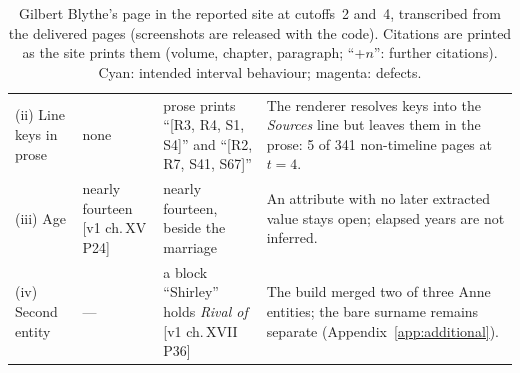 \begin{table}[t]
\begin{tabular}{@{}>{\raggedright\arraybackslash}p{2.35cm}>{\raggedright\arraybackslash}p{3.85cm}>{\raggedright\arraybackslash}p{4.45cm}>{\raggedright\arraybackslash}p{4.45cm}@{}}
(ii) Line keys in prose & none & prose prints ``[R3, R4, S1, S4]'' and ``[R2, R7, S41, S67]'' & The renderer resolves keys into the \emph{Sources} line but leaves them in the prose: 5 of 341 non-timeline pages at $t{=}4$. \\
(iii) Age & nearly fourteen [v1 ch.\,XV P24] & nearly fourteen, beside the marriage & An attribute with no later extracted value stays open; elapsed years are not inferred. \\
(iv) Second entity & --- & a block ``Shirley'' holds \emph{Rival of} [v1 ch.\,XVII P36] & The build merged two of three Anne entities; the bare surname remains separate (Appendix~\ref{app:additional}). \\
\bottomrule
\end{tabular}
\caption{Gilbert Blythe's page in the reported \sys site at cutoffs~2 and~4, transcribed from
the delivered pages (screenshots are released with the code). Citations are printed as the
site prints them (volume, chapter, paragraph; ``+$n$'': further citations). Cyan: intended
interval behaviour; magenta: defects.}
\label{tab:qual-diff}
\end{table}


